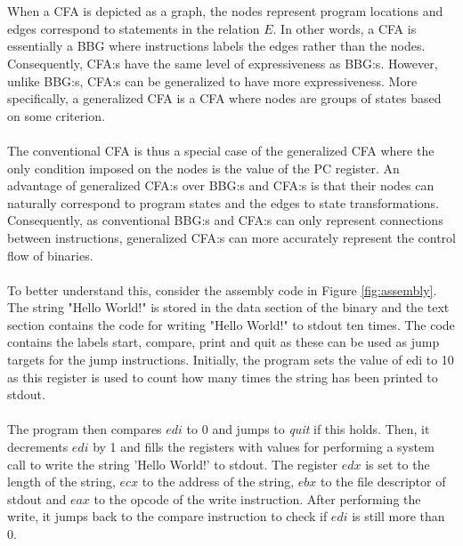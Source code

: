 \documentclass{kththesis}
\renewcommand{\it}[1]{\textit{#1}}
\begin{document}
\\ \\
When a CFA is depicted as a graph, the nodes represent program locations and edges correspond to statements in the relation $E$. In other words, a CFA is essentially a BBG where instructions labels the edges rather than the nodes. Consequently, CFA:s have the same level of expressiveness as BBG:s. However, unlike BBG:s, CFA:s can be generalized to have more expressiveness. More specifically, a generalized CFA is a CFA where nodes are groups of states based on some criterion. 
\\ \\
The conventional CFA is thus a special case of the generalized CFA where the only condition imposed on the nodes is the value of the PC register. An advantage of generalized CFA:s over BBG:s and CFA:s is that their nodes can naturally correspond to program states and the edges to state transformations. Consequently, as conventional BBG:s and CFA:s can only represent connections between instructions, generalized CFA:s can more accurately represent the control flow of binaries.
\\ \\
To better understand this, consider the assembly code in Figure \ref{fig:assembly}. The string "Hello World!" is stored in the data section of the binary and the text section contains the code for writing "Hello World!" to stdout ten times. The code contains the labels start, compare, print and quit as these can be used as jump targets for the jump instructions. Initially, the program sets the value of edi to 10 as this register is used to count how many times the string has been printed to stdout.
\\ \\
The program then compares $edi$ to 0 and jumps to \it{quit} if this holds. Then, it decrements $edi$ by 1 and fills the registers with values for performing a system call to write the string 'Hello World!' to stdout. The register $edx$ is set to the length of the string, $ecx$ to the address of the string, $ebx$ to the file descriptor of stdout and $eax$ to the opcode of the write instruction. After performing the write, it jumps back to the compare instruction to check if $edi$ is still more than 0.
\end{document}
